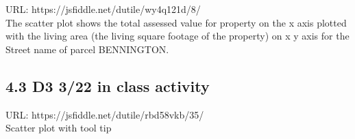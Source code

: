 \documentclass{neu_handout}
\begin{document}
URL: https://jsfiddle.net/dutile/wy4q121d/8/ \\

The scatter plot shows the total assessed value for property on the x axis plotted with the living area (the living square footage of the property) on x y axis for the Street name of parcel BENNINGTON.

\subsection*{4.3 D3 3/22 in class activity}

URL: https://jsfiddle.net/dutile/rbd58vkb/35/ \\

Scatter plot with tool tip
\end{document}
